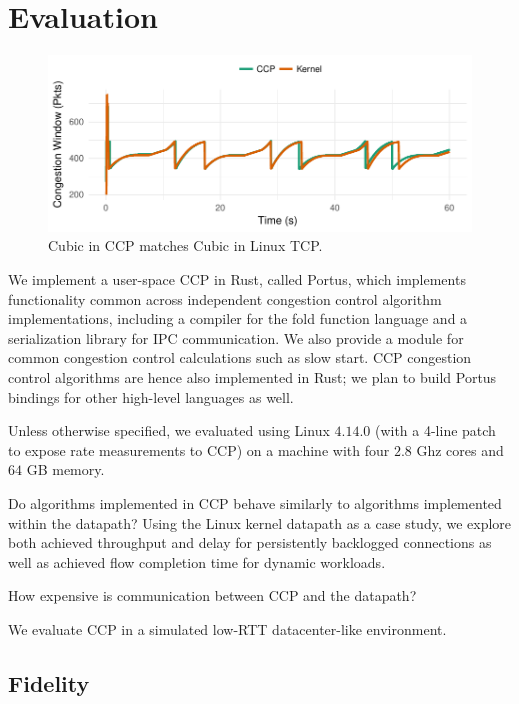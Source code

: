 \section{Evaluation}
\label{sec:eval}
\begin{figure}[t]
\centering
    \includegraphics[width=\columnwidth]{img/cubic-3-cwnd-evo-new}
    \caption{Cubic in CCP matches Cubic in Linux TCP.}\label{fig:eval:fidelity:time}
\end{figure}

We implement a user-space CCP in Rust, called Portus, which implements functionality common across independent congestion control algorithm implementations, including a compiler for the fold function language and a serialization library for IPC communication. 
We also provide a module for common congestion control calculations such as slow start.
CCP congestion control algorithms are hence also implemented in Rust; we plan to build Portus bindings for other high-level languages as well.

\smallskip
\noindent
Unless otherwise specified, we evaluated using Linux $4.14.0$ (with a 4-line patch to expose rate measurements to CCP) on a machine with four $2.8$ Ghz cores and $64$ GB memory.

 Do algorithms implemented in CCP behave similarly to algorithms implemented within the datapath? Using the Linux kernel datapath as a case study, we explore both achieved throughput and delay for persistently backlogged connections as well as achieved flow completion time for dynamic workloads.

 How expensive is communication between CCP and the datapath?

 We evaluate CCP in a simulated low-RTT datacenter-like environment.

\subsection{Fidelity}
\label{sec:eval:fidelity}

